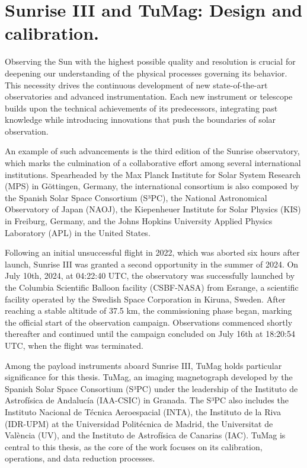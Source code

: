 \chapter{Sunrise III and TuMag: Design and calibration.}

Observing the Sun with the highest possible quality and resolution is crucial for deepening our understanding of the physical processes governing its behavior. This necessity drives the continuous development of new state-of-the-art observatories and advanced instrumentation. Each new instrument or telescope builds upon the technical achievements of its predecessors, integrating past knowledge while introducing innovations that push the boundaries of solar observation. 

An example of such advancements is the third edition of the Sunrise observatory, which marks the culmination of a collaborative effort among several international institutions. Spearheaded by the Max Planck Institute for Solar System Research (MPS) in Göttingen, Germany, the international consortium is also composed by the Spanish Solar Space Consortium (S³PC), the National Astronomical Observatory of Japan (NAOJ), the Kiepenheuer Institute for Solar Physics (KIS) in Freiburg, Germany, and the Johns Hopkins University Applied Physics Laboratory (APL) in the United States. 

Following an initial unsuccessful flight in 2022, which was aborted six hours after launch, Sunrise III was granted a second opportunity in the summer of 2024. On July 10th, 2024, at 04:22:40 UTC, the observatory was successfully launched by the Columbia Scientific Balloon facility (CSBF-NASA) from Esrange, a scientific facility operated by the Swedish Space Corporation in Kiruna, Sweden. After reaching a stable altitude of 37.5 km, the commissioning phase began, marking the official start of the observation campaign. Observations commenced shortly thereafter and continued until the campaign concluded on July 16th at 18:20:54 UTC, when the flight was terminated.

Among the payload instruments aboard Sunrise III, TuMag holds particular significance for this thesis. TuMag, an imaging magnetograph developed by the Spanish Solar Space Consortium (S³PC) under the leadership of the Instituto de Astrofísica de Andalucía (IAA-CSIC) in Granada. The S³PC also includes the Instituto Nacional de Técnica Aeroespacial (INTA), the Instituto de la Riva (IDR-UPM) at the Universidad Politécnica de Madrid, the Universitat de València (UV), and the Instituto de Astrofísica de Canarias (IAC). TuMag is central to this thesis, as the core of the work focuses on its calibration, operations, and data reduction processes.

